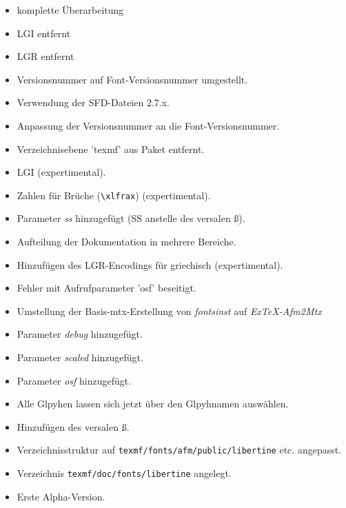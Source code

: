 \documentclass{fontdokuold}
\begin{document}
\begin{description}
\begin{itemize}
\item komplette Überarbeitung
\item LGI entfernt
\item LGR entfernt
\item Versionsnummer auf Font-Versionsnummer umgestellt.
\end{itemize}
\item [08. Januar 2008]
\begin{itemize}
\item Verwendung der SFD-Dateien 2.7.x.
\item Anpassung der Versionsnummer an die Font-Versionsnummer.
\item Verzeichnisebene 'texmf' aus Paket entfernt.
\item LGI (expertimental).
\item Zahlen für Brüche (\verb|\xlfrax|) (expertimental).
\item Parameter \emph{ss} hinzugefügt (SS anstelle des versalen ß).
\item Aufteilung der Dokumentation in mehrere Bereiche.
\item Hinzufügen des LGR-Encodings für griechisch (expertimental).
\item Fehler mit Aufrufparameter 'osf' beseitigt.
\end{itemize}
\item [11. Juni 2007]
\begin{itemize}
\item Umstellung der Basis-mtx-Erstellung von \emph{fontsinst} auf \emph{ExTeX-Afm2Mtx}
\item Parameter \emph{debug} hinzugefügt.
\item Parameter \emph{scaled} hinzugefügt.
\item Parameter \emph{osf} hinzugefügt.
\item Alle Glpyhen lassen sich jetzt über den Glpyhnamen auswählen.
\item Hinzufügen des versalen ß.
\item Verzeichnisstruktur auf \texttt{texmf/fonts/afm/public/libertine} etc. angepasst.
\item Verzeichnis \texttt{texmf/doc/fonts/libertine} angelegt.
\end{itemize}
\item[1. Mai 2007]
\begin{itemize}
\item Erste Alpha-Version.
\end{itemize}
\end{description}
\end{document}
